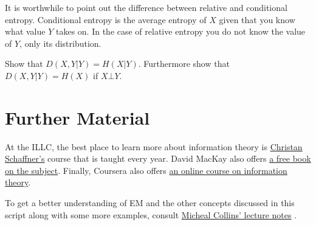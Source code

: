 It is worthwhile to point out the difference between relative and conditional entropy. Conditional entropy is the average entropy of $ X $ given that you
know what value $ Y $ takes on. In the case of relative entropy you do not know the value of $ Y $, only its distribution.

\begin{Exercise}
Show that $ D(X,Y|Y) = H(X|Y) $. Furthermore show that $ D(X,Y|Y) = H(X) $ if $ X\bot Y $.
\end{Exercise}

\section*{Further Material}

At the ILLC, the best place to learn more about information theory is \href{http://homepages.cwi.nl/~schaffne/courses/inftheory/2015/}{Christan Schaffner's}
course that is taught every year. David MacKay also offers \href{http://www.inference.phy.cam.ac.uk/itprnn/book.pdf}{a free book on the subject}. Finally,
Coursera also offers \href{https://www.coursera.org/course/informationtheory}{an online course on information theory}.

To get a better understanding of EM and the other concepts discussed in this script along with some more examples, consult 
\href{http://www.cs.columbia.edu/~mcollins/em.pdf}{Micheal Collins' lecture notes} .

